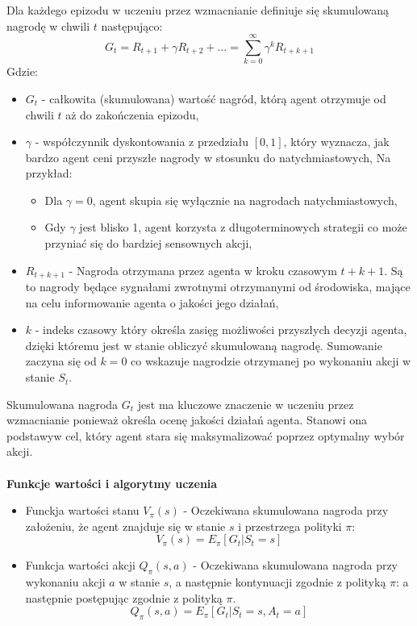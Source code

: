 \documentclass[a4paper, 12pt]{article}
\numberwithin{equation}{section}
\begin{document}
    Dla każdego epizodu w uczeniu przez wzmacnianie definiuje się skumulowaną nagrodę w chwili \( t \) następująco:
    \begin{equation}
    G_t = R_{t+1} + \gamma R_{t+2} + ... = \sum_{k=0}^{\infty} \gamma^k R_{t+k+1} 
    \end{equation}
    Gdzie:
    \begin{itemize}
        \item \( G_t \) - całkowita (skumulowana) wartość nagród, którą agent otrzymuje od chwili \( t \) aż do zakończenia epizodu,
        \item \( \gamma \) - współczynnik dyskontowania z przedziału \( [0,1] \), który wyznacza, jak bardzo agent ceni przyszłe nagrody w stosunku do natychmiastowych,
        Na przykład:
        \begin{itemize}
            \item Dla \( \gamma = 0 \), agent skupia się wyłącznie na nagrodach natychmiastowych,
            \item Gdy \( \gamma \) jest blisko 1, agent korzysta z długoterminowych strategii co może przyniać się do bardziej sensownych akcji,
        \end{itemize}
        \item \( R_{t+k+1} \) - Nagroda otrzymana przez agenta w kroku czasowym \( t + k + 1 \). Są to nagrody będące sygnałami zwrotnymi otrzymanymi
        od środowiska, mające na celu informowanie agenta o jakości jego działań,
        \item \( k \) - indeks czasowy który określa zasięg możliwości przyszłych decyzji agenta, dzięki któremu jest w stanie obliczyć skumulowaną nagrodę.
        Sumowanie zaczyna się od \( k = 0 \) co wskazuje nagrodzie otrzymanej po wykonaniu akcji w stanie \( S_t \).
    \end{itemize}
    Skumulowana nagroda \( G_t \) jest ma kluczowe znaczenie w uczeniu przez wzmacnianie ponieważ określa ocenę jakości działań agenta. Stanowi ona podstawyw cel, który agent stara się 
    maksymalizować poprzez optymalny wybór akcji.
    \\ \\ 
    \textbf{Funkcje wartości i algorytmy uczenia}
    \begin{itemize}
        \item Funckja wartości stanu \( V_\pi(s) \) - Oczekiwana skumulowana nagroda przy założeniu, że agent znajduje się w stanie \( s \) i przestrzega polityki \( \pi \):
        \begin{equation}
        V_\pi(s) = E_\pi[G_t|S_t=s]
        \end{equation}
        \item Funkcja wartości akcji \( Q_\pi(s,a) \) - Oczekiwana skumulowana nagroda przy wykonaniu akcji \( a \) w stanie \( s \), a następnie kontynuacji zgodnie z polityką \( \pi \):
        a następnie postępując zgodnie z polityką \( \pi \).
        \begin{equation}
        Q_\pi(s,a) = E_\pi[G_t|S_t=s,A_t=a] 
        \end{equation}
    \end{itemize}
\end{document}
